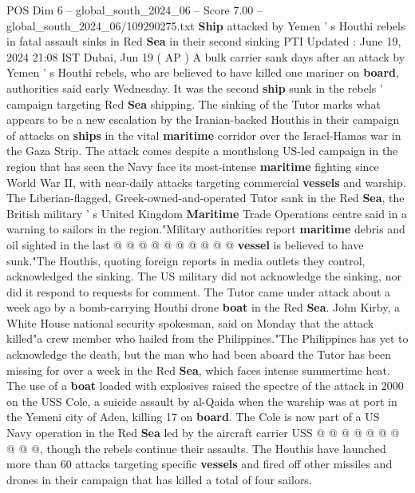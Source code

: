\begin{textsample}{POS Dim 6 – global\_south\_2024\_06 – Score 7.00 – global\_south\_2024\_06/109290275.txt}  \label{ex:f6_pos_176}
\textbf{Ship} attacked by Yemen ' s Houthi rebels in fatal assault sinks in Red \textbf{Sea} in their second sinking PTI Updated : June 19, 2024 21:08 IST Dubai, Jun 19 ( AP ) A bulk carrier sank days after an attack by Yemen ' s Houthi rebels, who are believed to have killed one mariner on \textbf{board}, authorities said early Wednesday.
It was the second \textbf{ship} sunk in the rebels ' campaign targeting Red \textbf{Sea} shipping.
The sinking of the Tutor marks what appears to be a new escalation by the Iranian-backed Houthis in their campaign of attacks on \textbf{ships} in the vital \textbf{maritime} corridor over the Israel-Hamas war in the Gaza Strip.
The attack comes despite a monthslong US-led campaign in the region that has seen the Navy face its most-intense \textbf{maritime} fighting since World War II, with near-daily attacks targeting commercial \textbf{vessels} and warship.
The Liberian-flagged, Greek-owned-and-operated Tutor sank in the Red \textbf{Sea}, the British military ' s United Kingdom \textbf{Maritime} Trade Operations centre said in a warning to sailors in the region."Military authorities report \textbf{maritime} debris and oil sighted in the last @ @ @ @ @ @ @ @ @ @ \textbf{vessel} is believed to have sunk."The Houthis, quoting foreign reports in media outlets they control, acknowledged the sinking.
The US military did not acknowledge the sinking, nor did it respond to requests for comment.
The Tutor came under attack about a week ago by a bomb-carrying Houthi drone \textbf{boat} in the Red \textbf{Sea}.
John Kirby, a White House national security spokesman, said on Monday that the attack killed"a crew member who hailed from the Philippines."The Philippines has yet to acknowledge the death, but the man who had been aboard the Tutor has been missing for over a week in the Red \textbf{Sea}, which faces intense summertime heat.
The use of a \textbf{boat} loaded with explosives raised the spectre of the attack in 2000 on the USS Cole, a suicide assault by al-Qaida when the warship was at port in the Yemeni city of Aden, killing 17 on \textbf{board}.
The Cole is now part of a US Navy operation in the Red \textbf{Sea} led by the aircraft carrier USS @ @ @ @ @ @ @ @ @ @, though the rebels continue their assaults.
The Houthis have launched more than 60 attacks targeting specific \textbf{vessels} and fired off other missiles and drones in their campaign that has killed a total of four sailors.

\end{textsample}
